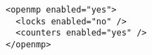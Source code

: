 \begin{verbatim}
<openmp enabled="yes">
  <locks enabled="no" />
  <counters enabled="yes" />
</openmp>
\end{verbatim}
